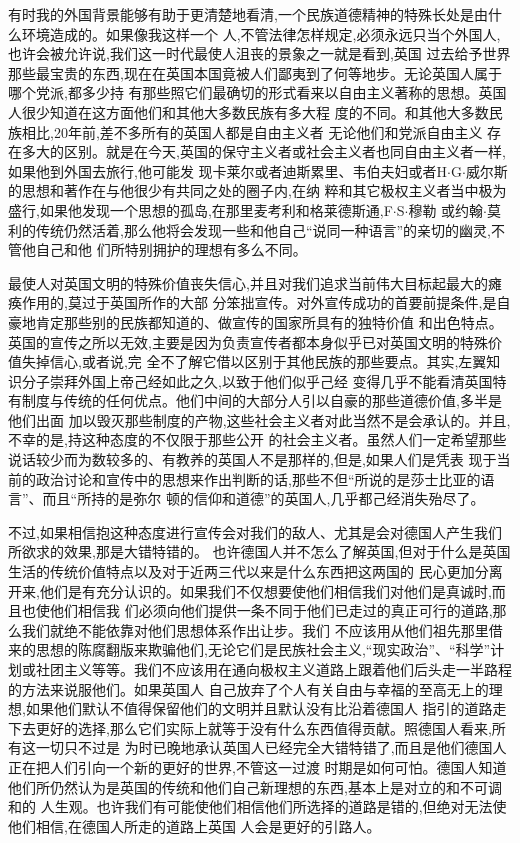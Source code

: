 ﻿\documentclass[12pt]{article}
\begin{document}
有时我的外国背景能够有助于更清楚地看清,一个民族道德精神的特殊长处是由什么环境造成的。如果像我这样一个
人,不管法律怎样规定,必须永远只当个外国人,也许会被允许说,我们这一时代最使人沮丧的景象之一就是看到,英国
过去给予世界那些最宝贵的东西,现在在英国本国竟被人们鄙夷到了何等地步。无论英国人属于哪个党派,都多少持
有那些照它们最确切的形式看来以自由主义著称的思想。英国人很少知道在这方面他们和其他大多数民族有多大程
度的不同。和其他大多数民族相比,20年前,差不多所有的英国人都是自由主义者 \myrule 无论他们和党派自由主义
存在多大的区别。就是在今天,英国的保守主义者或社会主义者也同自由主义者一样,如果他到外国去旅行,他可能发
现卡莱尔或者迪斯累里、韦伯夫妇或者H$\cdot$G$\cdot$威尔斯的思想和著作在与他很少有共同之处的圈子内,在纳
粹和其它极权主义者当中极为盛行,如果他发现一个思想的孤岛,在那里麦考利和格莱德斯通,F$\cdot$S$\cdot$穆勒
或约翰$\cdot$莫利的传统仍然活着,那么他将会发现一些和他自己``说同一种语言''的亲切的幽灵,不管他自己和他
们所特别拥护的理想有多么不同。

最使人对英国文明的特殊价值丧失信心,并且对我们追求当前伟大目标起最大的瘫痪作用的,莫过于英国所作的大部
分笨拙宣传。对外宣传成功的首要前提条件,是自豪地肯定那些别的民族都知道的、做宣传的国家所具有的独特价值
和出色特点。英国的宣传之所以无效,主要是因为负责宣传者都本身似乎已对英国文明的特殊价值失掉信心,或者说,完
全不了解它借以区别于其他民族的那些要点。其实,左翼知识分子崇拜外国上帝己经如此之久,以致于他们似乎己经
变得几乎不能看清英国特有制度与传统的任何优点。他们中间的大部分人引以自豪的那些道德价值,多半是他们出面
加以毁灭那些制度的产物,这些社会主义者对此当然不是会承认的。并且,不幸的是,持这种态度的不仅限于那些公开
的社会主义者。虽然人们一定希望那些说话较少而为数较多的、有教养的英国人不是那样的,但是,如果人们是凭表
现于当前的政治讨论和宣传中的思想来作出判断的话,那些不但``所说的是莎士比亚的语言''、而且``所持的是弥尔
顿的信仰和道德''的英国人,几乎都己经消失殆尽了。

不过,如果相信抱这种态度进行宣传会对我们的敌人、尤其是会对德国人产生我们所欲求的效果,那是大错特错的。
也许德国人并不怎么了解英国,但对于什么是英国生活的传统价值特点以及对于近两三代以来是什么东西把这两国的
民心更加分离开来,他们是有充分认识的。如果我们不仅想要使他们相信我们对他们是真诚时,而且也使他们相信我
们必须向他们提供一条不同于他们已走过的真正可行的道路,那么我们就绝不能依靠对他们思想体系作出让步。我们
不应该用从他们祖先那里借来的思想的陈腐翻版来欺骗他们,无论它们是民族社会主义,``现实政治''、``科学''计
划或社团主义等等。我们不应该用在通向极权主义道路上跟着他们后头走一半路程的方法来说服他们。如果英国人
自己放弃了个人有关自由与幸福的至高无上的理想,如果他们默认不值得保留他们的文明并且默认没有比沿着德国人
指引的道路走下去更好的选择,那么它们实际上就等于没有什么东西值得贡献。照德国人看来,所有这一切只不过是
为时已晚地承认英国人已经完全大错特错了,而且是他们德国人正在把人们引向一个新的更好的世界,不管这一过渡
时期是如何可怕。德国人知道他们所仍然认为是英国的传统和他们自己新理想的东西,基本上是对立的和不可调和的
人生观。也许我们有可能使他们相信他们所选择的道路是错的,但绝对无法使他们相信,在德国人所走的道路上英国
人会是更好的引路人。
\end{document}
